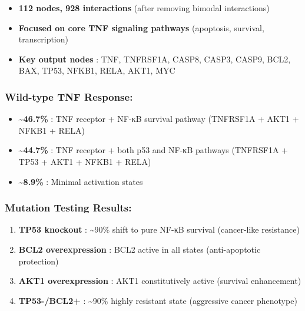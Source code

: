 \begin{itemize}
\tightlist
\item
  \textbf{112 nodes, 928 interactions} (after removing bimodal
  interactions)
\item
  \textbf{Focused on core TNF signaling pathways} (apoptosis, survival,
  transcription)
\item
  \textbf{Key output nodes} : TNF, TNFRSF1A, CASP8, CASP3, CASP9, BCL2,
  BAX, TP53, NFKB1, RELA, AKT1, MYC
\end{itemize}

\hypertarget{wild-type-tnf-response}{%
\subsubsection{\texorpdfstring{\textbf{Wild-type TNF
Response:}}{Wild-type TNF Response:}}\label{wild-type-tnf-response}}

\begin{itemize}
\tightlist
\item
  \textbf{\textasciitilde46.7\%} : TNF receptor + NF-κB survival pathway
  (TNFRSF1A + AKT1 + NFKB1 + RELA)
\item
  \textbf{\textasciitilde44.7\%} : TNF receptor + both p53 and NF-κB
  pathways (TNFRSF1A + TP53 + AKT1 + NFKB1 + RELA)
\item
  \textbf{\textasciitilde8.9\%} : Minimal activation states
\end{itemize}

\hypertarget{mutation-testing-results}{%
\subsubsection{\texorpdfstring{\textbf{Mutation Testing
Results:}}{Mutation Testing Results:}}\label{mutation-testing-results}}

\begin{enumerate}
\def\labelenumi{\arabic{enumi}.}
\tightlist
\item
  \textbf{TP53 knockout} : \textasciitilde90\% shift to pure NF-κB
  survival (cancer-like resistance)
\item
  \textbf{BCL2 overexpression} : BCL2 active in all states
  (anti-apoptotic protection)
\item
  \textbf{AKT1 overexpression} : AKT1 constitutively active (survival
  enhancement)
\item
  \textbf{TP53-/BCL2+} : \textasciitilde90\% highly resistant state
  (aggressive cancer phenotype)
\end{enumerate}

